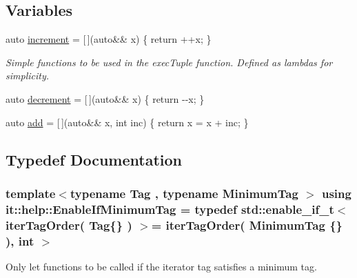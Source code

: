 \subsection*{Variables}
\begin{DoxyCompactItemize}
\item 
auto \hyperlink{namespaceit_1_1help_a47a31a8a4344c62bfbc0f7686d6160e1}{increment} = \mbox{[}$\,$\mbox{]}(auto\&\& x) \{ return ++x; \}
\begin{DoxyCompactList}\small\item\em Simple functions to be used in the \textquotesingle{}exec\+Tuple\textquotesingle{} function. Defined as lambdas for simplicity. \end{DoxyCompactList}\item 
auto \hyperlink{namespaceit_1_1help_aede42ee87c964f50151e495144d1085b}{decrement} = \mbox{[}$\,$\mbox{]}(auto\&\& x) \{ return -\/-\/x; \}
\item 
auto \hyperlink{namespaceit_1_1help_af07b5865ce1568f58510ad90edb12466}{add} = \mbox{[}$\,$\mbox{]}(auto\&\& x, int inc) \{ return x = x + inc; \}
\end{DoxyCompactItemize}


\subsection{Typedef Documentation}
\subsubsection[{\texorpdfstring{Enable\+If\+Minimum\+Tag}{EnableIfMinimumTag}}]{\setlength{\rightskip}{0pt plus 5cm}template$<$typename Tag , typename Minimum\+Tag $>$ using {\bf it\+::help\+::\+Enable\+If\+Minimum\+Tag} = typedef std\+::enable\+\_\+if\+\_\+t$<$ {\bf iter\+Tag\+Order}( Tag\{\} ) $>$= {\bf iter\+Tag\+Order}( Minimum\+Tag \{\} ), int $>$}\hypertarget{namespaceit_1_1help_a4f5a2a2ccba17fd27922b388ffaed363}{}\label{namespaceit_1_1help_a4f5a2a2ccba17fd27922b388ffaed363}


Only let functions to be called if the iterator tag satisfies a minimum tag. 

